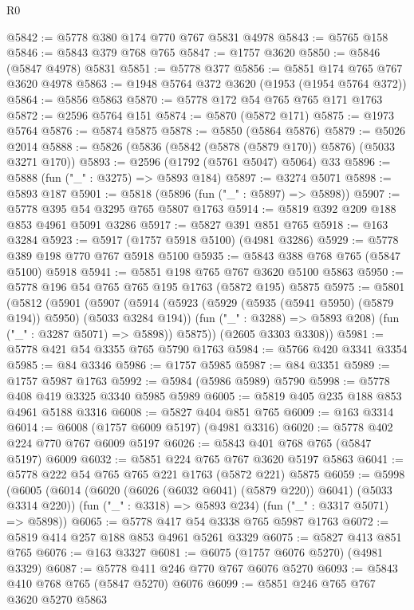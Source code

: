 \begin{lexlean}{R0}
\begin{coremodule}
{{{{{@5842 := @5778 @380 @174 @770 @767 @5831 @4978
@5843 := @5765 @158
@5846 := @5843 @379 @768 @765
@5847 := @1757 @3620
@5850 := @5846 (@5847 @4978) @5831
@5851 := @5778 @377
@5856 := @5851 @174 @765 @767 @3620 @4978
@5863 := @1948 @5764 @372 @3620 (@1953 (@1954 @5764 @372))
@5864 := @5856 @5863
@5870 := @5778 @172 @54 @765 @765 @171 @1763
@5872 := @2596 @5764 @151
@5874 := @5870 (@5872 @171)
@5875 := @1973 @5764
@5876 := @5874 @5875
@5878 := @5850 (@5864 @5876)
@5879 := @5026 @2014
@5888 := @5826 (@5836 (@5842 (@5878 (@5879 @170)) @5876) (@5033 @3271 @170))
@5893 := @2596 (@1792 (@5761 @5047) @5064) @33
@5896 := @5888 (fun ("_" : @3275) => @5893 @184)
@5897 := @3274 @5071
@5898 := @5893 @187
@5901 := @5818 (@5896 (fun ("_" : @5897) => @5898))
@5907 := @5778 @395 @54 @3295 @765 @5807 @1763
@5914 := @5819 @392 @209 @188 @853 @4961 @5091 @3286
@5917 := @5827 @391 @851 @765
@5918 := @163 @3284
@5923 := @5917 (@1757 @5918 @5100) (@4981 @3286)
@5929 := @5778 @389 @198 @770 @767 @5918 @5100
@5935 := @5843 @388 @768 @765 (@5847 @5100) @5918
@5941 := @5851 @198 @765 @767 @3620 @5100 @5863
@5950 := @5778 @196 @54 @765 @765 @195 @1763 (@5872 @195) @5875
@5975 := @5801
    (@5812
      (@5901
        (@5907
          (@5914
            (@5923 (@5929 (@5935 (@5941 @5950) (@5879 @194)) @5950) (@5033 @3284 @194))
            (fun ("_" : @3288) => @5893 @208)
            (fun ("_" : @3287 @5071) => @5898))
          @5875))
      (@2605 @3303 @3308))
@5981 := @5778 @421 @54 @3355 @765 @5790 @1763
@5984 := @5766 @420 @3341 @3354
@5985 := @84 @3346
@5986 := @1757 @5985
@5987 := @84 @3351
@5989 := @1757 @5987 @1763
@5992 := @5984 (@5986 @5989) @5790
@5998 := @5778 @408 @419 @3325 @3340 @5985 @5989
@6005 := @5819 @405 @235 @188 @853 @4961 @5188 @3316
@6008 := @5827 @404 @851 @765
@6009 := @163 @3314
@6014 := @6008 (@1757 @6009 @5197) (@4981 @3316)
@6020 := @5778 @402 @224 @770 @767 @6009 @5197
@6026 := @5843 @401 @768 @765 (@5847 @5197) @6009
@6032 := @5851 @224 @765 @767 @3620 @5197 @5863
@6041 := @5778 @222 @54 @765 @765 @221 @1763 (@5872 @221) @5875
@6059 := @5998
    (@6005
      (@6014 (@6020 (@6026 (@6032 @6041) (@5879 @220)) @6041) (@5033 @3314 @220))
      (fun ("_" : @3318) => @5893 @234)
      (fun ("_" : @3317 @5071) => @5898))
@6065 := @5778 @417 @54 @3338 @765 @5987 @1763
@6072 := @5819 @414 @257 @188 @853 @4961 @5261 @3329
@6075 := @5827 @413 @851 @765
@6076 := @163 @3327
@6081 := @6075 (@1757 @6076 @5270) (@4981 @3329)
@6087 := @5778 @411 @246 @770 @767 @6076 @5270
@6093 := @5843 @410 @768 @765 (@5847 @5270) @6076
@6099 := @5851 @246 @765 @767 @3620 @5270 @5863
}}}}}
\end{coremodule}
\end{lexlean}
